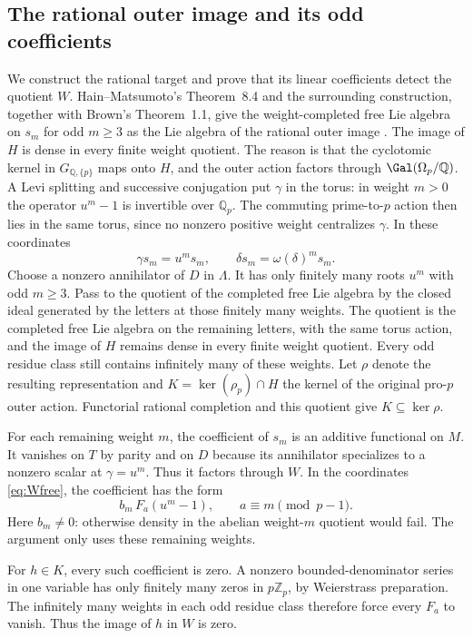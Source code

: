 \documentclass[11pt]{article}
\theoremstyle{definition}\newtheorem{definition}[theorem]{Definition}
\newcommand{\Z}{\mathbb Z}\newcommand{\Q}{\mathbb Q}
\begin{document}
\subsection{The rational outer image and its odd coefficients}

We construct the rational target and prove that its linear
coefficients detect the quotient $W$.
Hain--Matsumoto's Theorem~8.4 and the surrounding construction,
together with Brown's Theorem~1.1, give the weight-completed
free Lie algebra on $s_m$ for odd $m\geq3$ as the Lie algebra
of the rational outer image \cite{HM,Brown}.
The image of $H$ is dense in every finite weight quotient.
The reason is that the cyclotomic kernel in
$G_{\Q,\{p\}}$ maps onto $H$, and the outer action factors
through $\Gal(\Omega_p/\Q)$.
A Levi splitting and successive conjugation put $\gamma$
in the torus: in weight $m>0$ the operator $u^m-1$ is
invertible over $\Q_p$. The commuting prime-to-$p$ action
then lies in the same torus, since no nonzero positive weight
centralizes $\gamma$. In these coordinates
\[
           \gamma s_m=u^ms_m,\qquad
           \delta s_m=\omega(\delta)^m s_m.
\]
Choose a nonzero annihilator of $D$ in $\Lambda$. It has
only finitely many roots $u^m$ with odd $m\geq3$.
Pass to the quotient of the completed free Lie algebra by
the closed ideal generated by the letters at those finitely
many weights. The quotient is the completed free Lie algebra
on the remaining letters, with the same torus action, and
the image of $H$ remains dense in every finite weight quotient.
Every odd residue class still contains infinitely many of
these weights. Let $\rho$ denote the resulting representation
and $K=\ker(\rho_p)\cap H$ the kernel of the original
pro-$p$ outer action. Functorial rational completion and
this quotient give $K\subseteq\ker\rho$.

For each remaining weight $m$, the coefficient of $s_m$
is an additive functional on $M$. It vanishes on $T$ by
parity and on $D$ because its annihilator specializes to
a nonzero scalar at $\gamma=u^m$. Thus it factors through $W$.
In the coordinates \eqref{eq:Wfree}, the coefficient has
the form
\[
              b_m\,F_a(u^m-1),\qquad a\equiv m\pmod{p-1}.
\]
Here $b_m\ne0$: otherwise density in the abelian weight-$m$
quotient would fail. The argument only uses these remaining weights.

For $h\in K$, every such coefficient is zero. A nonzero
bounded-denominator series in one variable has only finitely
many zeros in $p\Z_p$, by Weierstrass preparation. The
infinitely many weights in each odd residue class therefore
force every $F_a$ to vanish. Thus the image of $h$ in $W$
is zero.
\end{document}
